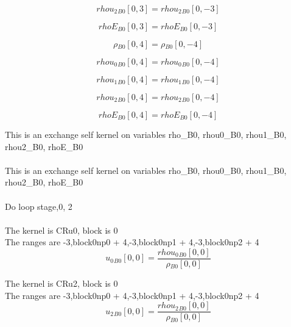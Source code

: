 \documentclass{article}
\begin{document}
\begin{dmath}{rhou_{2}{_{B0}}}[{0,3}] = {rhou_{2}{_{B0}}}[{0,-3}]\end{dmath}

\begin{dmath}{rhoE{_{B0}}}[{0,3}] = {rhoE{_{B0}}}[{0,-3}]\end{dmath}

\begin{dmath}{\rho{_{B0}}}[{0,4}] = {\rho{_{B0}}}[{0,-4}]\end{dmath}

\begin{dmath}{rhou_{0}{_{B0}}}[{0,4}] = {rhou_{0}{_{B0}}}[{0,-4}]\end{dmath}

\begin{dmath}{rhou_{1}{_{B0}}}[{0,4}] = {rhou_{1}{_{B0}}}[{0,-4}]\end{dmath}

\begin{dmath}{rhou_{2}{_{B0}}}[{0,4}] = {rhou_{2}{_{B0}}}[{0,-4}]\end{dmath}

\begin{dmath}{rhoE{_{B0}}}[{0,4}] = {rhoE{_{B0}}}[{0,-4}]\end{dmath}

\noindent This is an exchange self kernel on variables rho_B0, rhou0_B0, rhou1_B0, rhou2_B0, rhoE_B0\\\\\noindent This is an exchange self kernel on variables rho_B0, rhou0_B0, rhou1_B0, rhou2_B0, rhoE_B0\\\\\noindent Do loop stage,0, 2\\
\\\noindent The kernel is CRu0, block is 0\\\noindent The ranges are -3,block0np0 + 4,-3,block0np1 + 4,-3,block0np2 + 4\\\begin{dmath}{u_{0}{_{B0}}}[{0,0}] = \frac{{rhou_{0}{_{B0}}}[{0,0}]}{{\rho{_{B0}}}[{0,0}]}\end{dmath}

\noindent The kernel is CRu2, block is 0\\\noindent The ranges are -3,block0np0 + 4,-3,block0np1 + 4,-3,block0np2 + 4\\\begin{dmath}{u_{2}{_{B0}}}[{0,0}] = \frac{{rhou_{2}{_{B0}}}[{0,0}]}{{\rho{_{B0}}}[{0,0}]}\end{dmath}
\end{document}
